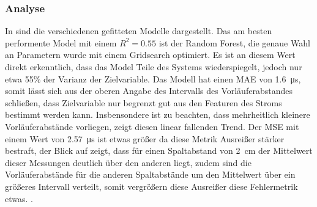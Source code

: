 \subsubsection{Analyse}
In  sind die verschiedenen gefitteten Modelle dargestellt. Das am besten performente Model mit einem \(R^2 = 0.55\) ist der Random Forest, die genaue Wahl an Parametern wurde mit einem Gridsearch optimiert. Es ist an diesem Wert direkt erkenntlich, dass das Model Teile des Systems wiederspiegelt, jedoch nur etwa 55\% der Varianz der Zielvariable. Das Modell hat einen MAE von \SI{1,6}{\micro\second}, somit lässt sich aus der oberen Angabe des Intervalls des Vorläuferabstandes schließen, dass Zielvariable nur begrenzt gut aus den Featuren des Stroms  bestimmt werden kann. Insbensondere ist zu beachten, dass mehrheitlich kleinere Vorläuferabstände vorliegen,  zeigt diesen linear fallenden Trend. Der MSE mit einem Wert von \SI{2,57}{\micro\second} ist etwas größer da diese Metrik Ausreißer stärker bestraft, der Blick auf  zeigt, dass für einen Spaltabstand von \SI{2}{\centi\meter} der Mittelwert dieser Messungen deutlich über den anderen liegt, zudem sind die Vorläuferabstände für die anderen Spaltabstände um den Mittelwert über ein größeres Intervall verteilt, somit vergrößern diese Ausreißer diese Fehlermetrik etwas.
.

